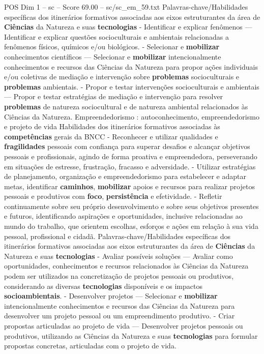 \begin{textsample}{POS Dim 1 – sc – Score 69.00 – sc/sc\_em\_59.txt}
Palavras-chave/Habilidades específicas dos itinerários formativos associadas aos eixos estruturantes da área de \textbf{Ciências} da Natureza e suas \textbf{tecnologias} - Identificar e explicar fenômenos — Identificar e explicar questões socioculturais e ambientais relacionadas a fenômenos físicos, químicos e/ou biológicos. - Selecionar e \textbf{mobilizar} conhecimentos científicos — Selecionar e \textbf{mobilizar} intencionalmente conhecimentos e recursos das Ciências da Natureza para propor ações individuais e/ou coletivas de mediação e intervenção sobre \textbf{problemas} socioculturais e \textbf{problemas} ambientais. - Propor e testar intervenções socioculturais e ambientais — Propor e testar estratégias de mediação e intervenção para resolver \textbf{problemas} de natureza sociocultural e de natureza ambiental relacionados às Ciências da Natureza.
Empreendedorismo : autoconhecimento, empreendedorismo e projeto de vida Habilidades dos itinerários formativos associadas às \textbf{competências} gerais da BNCC - Reconhecer e utilizar qualidades e \textbf{fragilidades} pessoais com confiança para superar desafios e alcançar objetivos pessoais e profissionais, agindo de forma proativa e empreendedora, perseverando em situações de estresse, frustração, fracasso e adversidade. - Utilizar estratégias de planejamento, organização e empreendedorismo para estabelecer e adaptar metas, identificar \textbf{caminhos}, \textbf{mobilizar} apoios e recursos para realizar projetos pessoais e produtivos com \textbf{foco}, \textbf{persistência} e efetividade. - Refletir continuamente sobre seu próprio desenvolvimento e sobre seus objetivos presentes e futuros, identificando aspirações e oportunidades, inclusive relacionadas ao mundo do trabalho, que orientem escolhas, esforços e ações em relação à sua vida pessoal, profissional e cidadã.
Palavras-chave/Habilidades específicas dos itinerários formativos associadas aos eixos estruturantes da área de \textbf{Ciências} da Natureza e suas \textbf{tecnologias} - Avaliar possíveis soluções — Avaliar como oportunidades, conhecimentos e recursos relacionados às Ciências da Natureza podem ser utilizados na concretização de projetos pessoais ou produtivos, considerando as diversas \textbf{tecnologias} disponíveis e os impactos \textbf{socioambientais}. - Desenvolver projetos — Selecionar e \textbf{mobilizar} intencionalmente conhecimentos e recursos das Ciências da Natureza para desenvolver um projeto pessoal ou um empreendimento produtivo. - Criar propostas articuladas ao projeto de vida — Desenvolver projetos pessoais ou produtivos, utilizando as Ciências da Natureza e suas \textbf{tecnologias} para formular propostas concretas, articuladas com o projeto de vida.

\end{textsample}
